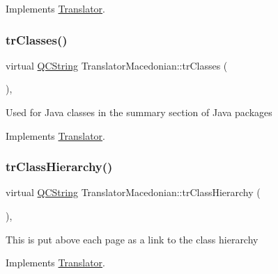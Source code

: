 Implements \mbox{\hyperlink{class_translator}{Translator}}.

\mbox{\label{class_translator_macedonian_a48f348185613400f505a42b4d27af5d4}} 
\subsubsection{\texorpdfstring{trClasses()}{trClasses()}}
{\footnotesize\ttfamily virtual \mbox{\hyperlink{class_q_c_string}{Q\+C\+String}} Translator\+Macedonian\+::tr\+Classes (\begin{DoxyParamCaption}{ }\end{DoxyParamCaption})\hspace{0.3cm}{\ttfamily [inline]}, {\ttfamily [virtual]}}

Used for Java classes in the summary section of Java packages 

Implements \mbox{\hyperlink{class_translator}{Translator}}.

\mbox{\label{class_translator_macedonian_ab44f63ae48c0cdfc83caa12acaeaa98f}} 
\subsubsection{\texorpdfstring{trClassHierarchy()}{trClassHierarchy()}}
{\footnotesize\ttfamily virtual \mbox{\hyperlink{class_q_c_string}{Q\+C\+String}} Translator\+Macedonian\+::tr\+Class\+Hierarchy (\begin{DoxyParamCaption}{ }\end{DoxyParamCaption})\hspace{0.3cm}{\ttfamily [inline]}, {\ttfamily [virtual]}}

This is put above each page as a link to the class hierarchy 

Implements \mbox{\hyperlink{class_translator}{Translator}}.

\mbox{\label{class_translator_macedonian_a7e187415fcd75f7377a0e0e174929899}} 
